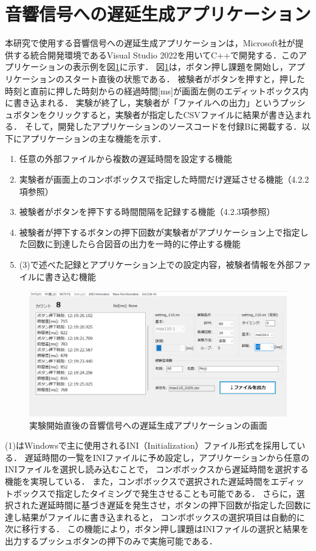 \section{音響信号への遅延生成アプリケーション}
本研究で使用する音響信号への遅延生成アプリケーションは，Microsoft社が提供する統合開発環境であるVisual Studio 2022を用いてC++で開発する．このアプリケーションの表示例を図\ref{fig:app_kyakkann}に示す．
図\ref{fig:app_kyakkann}は，ボタン押し課題を開始し，アプリケーションのスタート直後の状態である．
被験者がボタンを押すと，押した時刻と直前に押した時刻からの経過時間[ms]が画面左側のエディットボックス内に書き込まれる．
実験が終了し，実験者が「ファイルへの出力」というプッシュボタンをクリックすると，実験者が指定したCSVファイルに結果が書き込まれる．
そして，開発したアプリケーションのソースコードを付録Bに掲載する．以下にアプリケーションの主な機能を示す．
\begin{enumerate}[leftmargin=*]
\item 任意の外部ファイルから複数の遅延時間を設定する機能
\item 実験者が画面上のコンボボックスで指定した時間だけ遅延させる機能（4.2.2項参照）
\item 被験者がボタンを押下する時間間隔を記録する機能（4.2.3項参照）
\item 被験者が押下するボタンの押下回数が実験者がアプリケーション上で指定した回数に到達したら合図音の出力を一時的に停止する機能
\item (3)で述べた記録とアプリケーション上での設定内容，被験者情報を外部ファイルに書き込む機能
\end{enumerate}
\begin{figure}[tb]
  \centering
  \includegraphics[scale=0.34]{figures/Apprication/App_kyakkann.png}
  \caption{実験開始直後の音響信号への遅延生成アプリケーションの画面}
  \label{fig:app_kyakkann}
\end{figure}
(1)はWindowsで主に使用されるINI（Initialization）ファイル形式を採用している．
遅延時間の一覧をINIファイルに予め設定し，アプリケーションから任意のINIファイルを選択し読み込むことで，
コンボボックスから遅延時間を選択する機能を実現している．
また，コンボボックスで選択された遅延時間をエディットボックスで指定したタイミングで発生させることも可能である．
さらに，選択された遅延時間に基づき遅延を発生させ，ボタンの押下回数が指定した回数に達し結果がファイルに書き込まれると，
コンボボックスの選択項目は自動的に次に移行する．
この機能により，ボタン押し課題はINIファイルの選択と結果を出力するプッシュボタンの押下のみで実施可能である．
